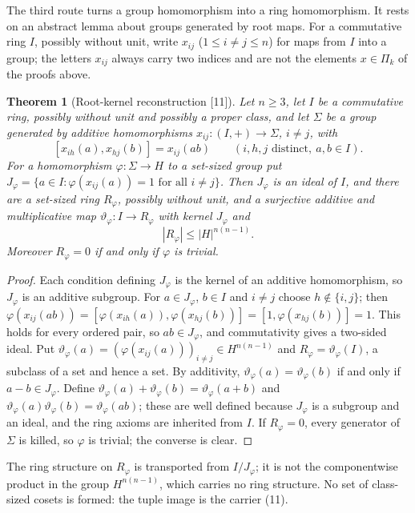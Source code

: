 \documentclass[11pt,oneside]{article}
\numberwithin{equation}{section}
\newtheorem{theorem}{Theorem}[section]
\theoremstyle{definition}
\theoremstyle{remark}
\newcommand{\src}[1]{\textup{\textsf{\small[#1]}}}
\begin{document}
The third route turns a group homomorphism into a ring homomorphism. It rests
on an abstract lemma about groups generated by root maps. For a commutative
ring $I$, possibly without unit, write $x_{ij}$ ($1\le i\ne j\le n$) for maps
from $I$ into a group; the letters $x_{ij}$ always carry two indices and are
not the elements $x\in\Pi_k$ of the proofs above.

\begin{theorem}[Root-kernel reconstruction \src{11}]\label{ogl:ker:thm:rootkernel}
Let $n\ge3$, let $I$ be a commutative ring, possibly without unit and possibly
a proper class, and let $\Sigma$ be a group generated by additive
homomorphisms $x_{ij}:(I,+)\to\Sigma$, $i\ne j$, with
\begin{equation}\label{ogl:ker:eq:abstractcomm}
 [x_{ih}(a),x_{hj}(b)]=x_{ij}(ab)\qquad(i,h,j\text{ distinct},\ a,b\in I).
\end{equation}
For a homomorphism $\varphi:\Sigma\to H$ to a set-sized group put
$J_\varphi=\{a\in I:\varphi(x_{ij}(a))=1\text{ for all }i\ne j\}$. Then
$J_\varphi$ is an ideal of $I$, and there are a set-sized ring $R_\varphi$,
possibly without unit, and a surjective additive and multiplicative map
$\vartheta_\varphi:I\to R_\varphi$ with kernel $J_\varphi$ and
\[
 |R_\varphi|\le|H|^{n(n-1)} .
\]
Moreover $R_\varphi=0$ if and only if $\varphi$ is trivial.
\end{theorem}
\begin{proof}
Each condition defining $J_\varphi$ is the kernel of an additive
homomorphism, so $J_\varphi$ is an additive subgroup. For $a\in J_\varphi$,
$b\in I$ and $i\ne j$ choose $h\notin\{i,j\}$; then
$\varphi(x_{ij}(ab))=[\varphi(x_{ih}(a)),\varphi(x_{hj}(b))]=[1,\varphi(x_{hj}(b))]=1$.
This holds for every ordered pair, so $ab\in J_\varphi$, and commutativity gives
a two-sided ideal. Put
$\vartheta_\varphi(a)=(\varphi(x_{ij}(a)))_{i\ne j}\in H^{n(n-1)}$ and
$R_\varphi=\vartheta_\varphi(I)$, a subclass of a set and hence a set. By
additivity, $\vartheta_\varphi(a)=\vartheta_\varphi(b)$ if and only if
$a-b\in J_\varphi$. Define
$\vartheta_\varphi(a)+\vartheta_\varphi(b)=\vartheta_\varphi(a+b)$ and
$\vartheta_\varphi(a)\vartheta_\varphi(b)=\vartheta_\varphi(ab)$; these are
well defined because $J_\varphi$ is a subgroup and an ideal, and the ring
axioms are inherited from $I$. If $R_\varphi=0$, every generator of $\Sigma$
is killed, so $\varphi$ is trivial; the converse is clear.
\end{proof}

The ring structure on $R_\varphi$ is transported from $I/J_\varphi$; it is not
the componentwise product in the group $H^{n(n-1)}$, which carries no ring
structure. No set of class-sized cosets is formed: the tuple image is the
carrier (11).
\end{document}
